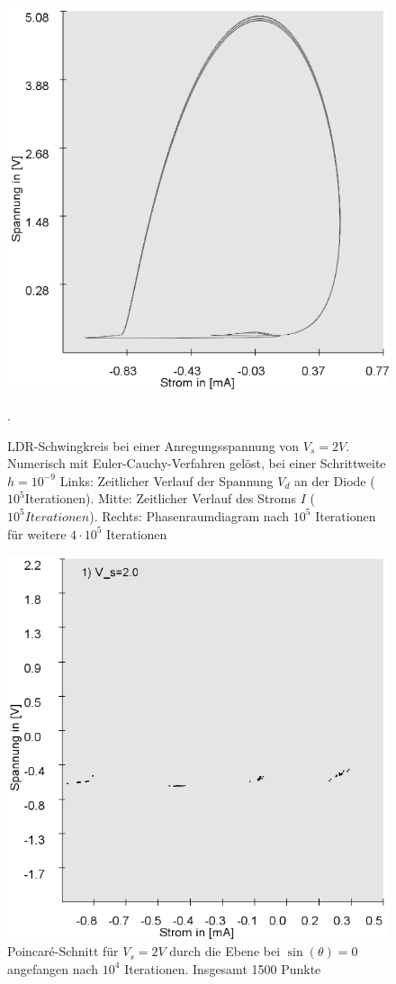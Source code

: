 \documentclass{scrartcl}
\begin{document}
\begin{figure}
\includegraphics[scale=0.28]{V_s-2V}
\caption{LDR-Schwingkreis bei einer Anregungsspannung von $V_s=2V$. Numerisch mit Euler-Cauchy-Verfahren gelöst, bei einer Schrittweite $h=10^{-9}$ Links: Zeitlicher Verlauf der Spannung $V_d$ an der Diode ($10^5$Iterationen). Mitte: Zeitlicher Verlauf des Stroms $I$ ($10^5 Iterationen$). Rechts: Phasenraumdiagram nach $10^5$ Iterationen für weitere $4 \cdot 10^5$ Iterationen }. 
\label{fig:ldr_v2}
\end{figure}

\begin{figure}
\includegraphics[scale=0.5]{Poincare-nach10000iterations}
\caption{Poincaré-Schnitt für $V_s=2V$ durch die Ebene bei $\sin(\theta)=0$ angefangen nach $10^4$ Iterationen. Insgesamt 1500 Punkte}
\label{fig:ldr-prd}
\end{figure}
\end{document}
